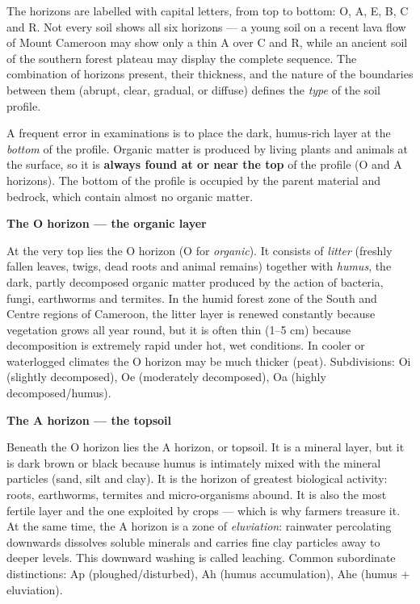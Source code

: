 \documentclass[11pt]{article}
\newcommand{\cle}[1]{{\popxbold\color{popdark}#1}}
\newcounter{popsec}
\newcounter{popsub}
\newcommand{\courssub}[1]{%
  \stepcounter{popsub}%
  \par\vspace{9pt}\noindent{\popxbold\fontsize{11.5}{13}\selectfont\color{popink}{\color{poporange}\thepopsec.\thepopsub}\hspace{6pt}#1}\par\nopagebreak\vspace{4pt}
}
\begin{document}
The horizons are labelled with capital letters, from top to bottom: \cle{O}, \cle{A}, \cle{E}, \cle{B}, \cle{C} and \cle{R}. Not every soil shows all six horizons --- a young soil on a recent lava flow of Mount Cameroon may show only a thin A over C and R, while an ancient soil of the southern forest plateau may display the complete sequence. The combination of horizons present, their thickness, and the nature of the boundaries between them (abrupt, clear, gradual, or diffuse) defines the \emph{type} of the soil profile.

\begin{attention}
A frequent error in examinations is to place the dark, humus-rich layer at the \emph{bottom} of the profile. Organic matter is produced by living plants and animals at the surface, so it is \textbf{always found at or near the top} of the profile (O and A horizons). The bottom of the profile is occupied by the parent material and bedrock, which contain almost no organic matter.
\end{attention}

\courssub{Description of the Master Horizons}

\textbf{The O horizon --- the organic layer}\par
At the very top lies the \cle{O horizon} (O for \emph{organic}). It consists of \emph{litter} (freshly fallen leaves, twigs, dead roots and animal remains) together with \emph{humus}, the dark, partly decomposed organic matter produced by the action of bacteria, fungi, earthworms and termites. In the humid forest zone of the South and Centre regions of Cameroon, the litter layer is renewed constantly because vegetation grows all year round, but it is often thin (1--5 cm) because decomposition is extremely rapid under hot, wet conditions. In cooler or waterlogged climates the O horizon may be much thicker (peat). Subdivisions: Oi (slightly decomposed), Oe (moderately decomposed), Oa (highly decomposed/humus).

\textbf{The A horizon --- the topsoil}\par
Beneath the O horizon lies the \cle{A horizon}, or \cle{topsoil}. It is a mineral layer, but it is dark brown or black because humus is intimately mixed with the mineral particles (sand, silt and clay). It is the horizon of greatest biological activity: roots, earthworms, termites and micro-organisms abound. It is also the most fertile layer and the one exploited by crops --- which is why farmers treasure it. At the same time, the A horizon is a zone of \emph{eluviation}: rainwater percolating downwards dissolves soluble minerals and carries fine clay particles away to deeper levels. This downward washing is called \cle{leaching}. Common subordinate distinctions: Ap (ploughed/disturbed), Ah (humus accumulation), Ahe (humus + eluviation).
\end{document}
